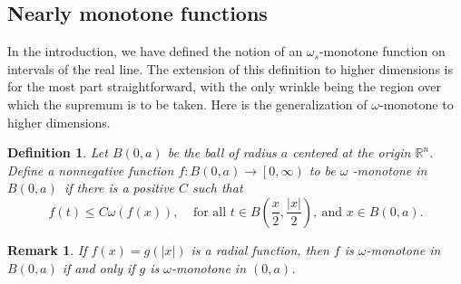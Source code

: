 \documentclass{amsart}
\theoremstyle{plain}
\newtheorem{definition}[theorem]{Definition}
\newtheorem{remark}[theorem]{Remark}
\numberwithin{equation}{section}
\begin{document}
\subsection{Nearly monotone functions}

In the introduction, we have defined the notion of an $\omega _{s}$-monotone
function on intervals of the real line. The extension of this definition to
higher dimensions is for the most part straightforward, with the only
wrinkle being the region over which the supremum is to be taken. Here is the
generalization of $\omega $-monotone to higher dimensions.

\begin{definition}
\label{weakly high}Let $B\left( 0,a\right) $ be the ball of radius $a$
centered at the origin $\mathbb{R}^{n}$. Define a nonnegative function $%
f:B\left( 0,a\right) \rightarrow \left[ 0,\infty \right) $ to be $\omega $%
\emph{-monotone in }$B\left( 0,a\right) $\emph{\ }if there is a positive $C$
such that%
\begin{equation*}
f\left( t\right) \leq C\omega \left( f\left( x\right) \right) ,\ \ \ \ \ 
\text{for all }t\in B\left( \frac{x}{2},\frac{\left\vert x\right\vert }{2}%
\right) ,\ \text{and }x\in B\left( 0,a\right) .
\end{equation*}
\end{definition}

\begin{remark}
If $f\left( x\right) =g\left( \left\vert x\right\vert \right) $ is a radial
function, then $f$ is $\omega $\emph{-}monotone in $B\left( 0,a\right) $ if
and only if $g$ is $\omega $\emph{-}monotone in $\left( 0,a\right) $.
\end{remark}
\end{document}
